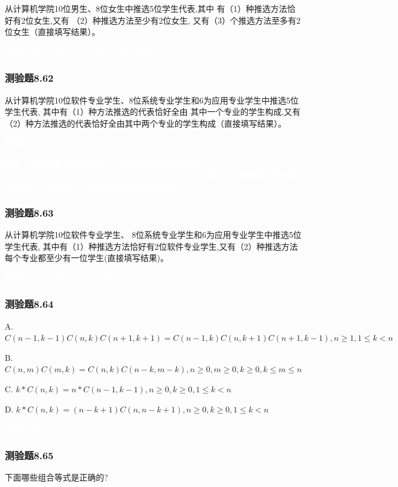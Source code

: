 \documentclass[UTF8, heading=true]{ctexart}
\begin{document}
从计算机学院10位男生、8位女生中推选5位学生代表,其中
有（1）种推选方法恰好有2位女生,又有
（2）种推选方法至少有2位女生,
又有（3）个推选方法至多有2位女生（直接填写结果）。

\textcolor{white}{答案：（1） 3360 （2） 6636 （3） 5292}

\subsubsection{测验题8.62}
从计算机学院10位软件专业学生、8位系统专业学生和6为应用专业学生中推选5位学生代表,
其中有（1）种方法推选的代表恰好全由
其中一个专业的学生构成,又有（2）种方法推选的代表恰好全由其中两个专业的学生构成（直接填写结果）。

\textcolor{white}{答案：（1） 314 （2） 14310}

\textcolor{white}{解析：第二问要记得减去由一个专业学生构成的情况：$C(18,5)+C(16,5)+C(14,5)-2\times 314 = 14310$（每一次计算两个专业的时候都算了一次仅含一个专业的,因此要减去两倍的314）。}

\subsubsection{测验题8.63}
从计算机学院10位软件专业学生、
8位系统专业学生和6为应用专业学生中推选5位学生代表,
其中有（1）种推选方法恰好有2位软件专业学生,又有（2）种推选方法每个专业都至少有一位学生(直接填写结果)。

\textcolor{white}{答案：（1） 16380 （2） 27880}


\subsubsection{测验题8.64}

A. $C(n-1, k-1) C(n, k) C(n+1, k+1)=C(n-1, k) C(n, k+1) C(n+1, k-1), n \geq 1,1 \leq k<n$

B. $ C(n, m) C(m, k)=C(n, k) C(n-k, m-k), n \geq 0, m \geq 0, k \geq 0, k \leq m \leq n$

C. $ k * C(n, k)=n * C(n-1, k-1),  n \geq 0, k \geq 0,1 \leq k<n$

D. $ k * C(n, k)=(n-k+1) C(n, n-k+1), n \geq 0, k \geq 0,1 \leq k<n$

\textcolor{white}{答案：BCD}

\subsubsection{测验题8.65}

下面哪些组合等式是正确的?
\end{document}
